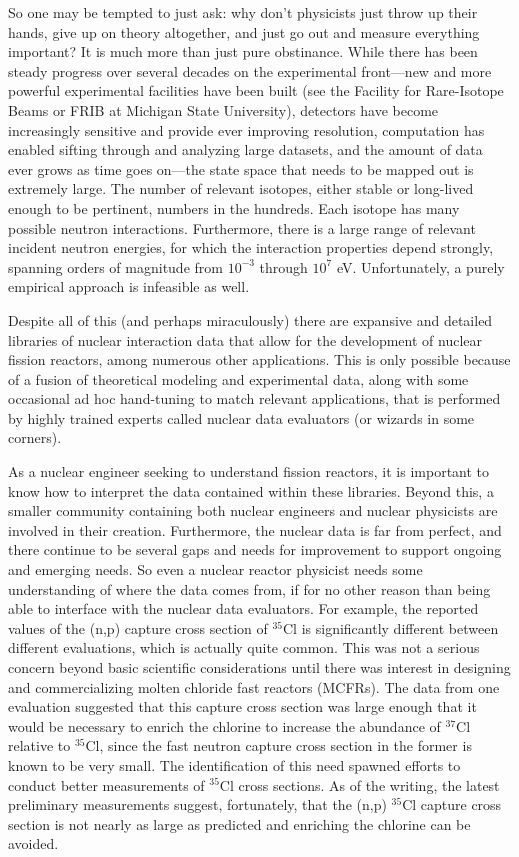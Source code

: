 So one may be tempted to just ask: why don't physicists just throw up their hands, give up on theory altogether, and just go out and measure everything important? It is much more than just pure obstinance. While there has been steady progress over several decades on the experimental front---new and more powerful experimental facilities have been built (see the Facility for Rare-Isotope Beams or FRIB at Michigan State University), detectors have become increasingly sensitive and provide ever improving resolution, computation has enabled sifting through and analyzing large datasets, and the amount of data ever grows as time goes on---the state space that needs to be mapped out is extremely large. The number of relevant isotopes, either stable or long-lived enough to be pertinent, numbers in the hundreds. Each isotope has many possible neutron interactions. Furthermore, there is a large range of relevant incident neutron energies, for which the interaction properties depend strongly, spanning orders of magnitude from $10^{-3}$ through $10^7$ eV. Unfortunately, a purely empirical approach is infeasible as well.

Despite all of this (and perhaps miraculously) there are expansive and detailed libraries of nuclear interaction data that allow for the development of nuclear fission reactors, among numerous other applications. This is only possible because of a fusion of theoretical modeling and experimental data, along with some occasional ad hoc hand-tuning to match relevant applications, that is performed by highly trained experts called nuclear data evaluators (or wizards in some corners).

As a nuclear engineer seeking to understand fission reactors, it is important to know how to interpret the data contained within these libraries. Beyond this, a smaller community containing both nuclear engineers and nuclear physicists are involved in their creation. Furthermore, the nuclear data is far from perfect, and there continue to be several gaps and needs for improvement to support ongoing and emerging needs. So even a nuclear reactor physicist needs some understanding of where the data comes from, if for no other reason than being able to interface with the nuclear data evaluators. For example, the reported values of the (n,p) capture cross section of $^{35}$Cl is significantly different between different evaluations, which is actually quite common. This was not a serious concern beyond basic scientific considerations until there was interest in designing and commercializing molten chloride fast reactors (MCFRs). The data from one evaluation suggested that this capture cross section was large enough that it would be necessary to enrich the chlorine to increase the abundance of $^{37}$Cl relative to $^{35}$Cl, since the fast neutron capture cross section in the former is known to be very small. The identification of this need spawned efforts to conduct better measurements of $^{35}$Cl cross sections. As of the writing, the latest preliminary measurements suggest, fortunately, that the (n,p) $^{35}$Cl capture cross section is not nearly as large as predicted and enriching the chlorine can be avoided.

